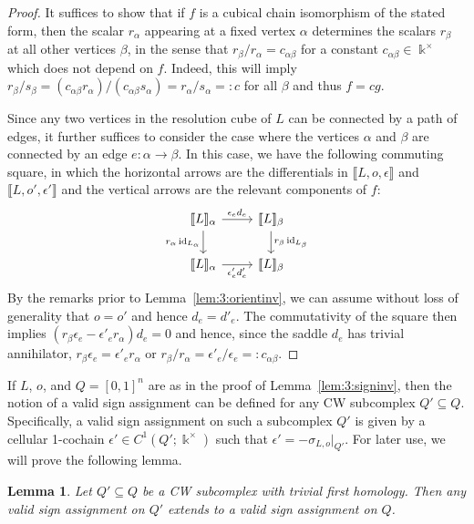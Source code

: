 \documentclass[12pt]{amsart}
\theoremstyle{definition}
\theoremstyle{plain}
\newtheorem{lemma}{Lemma}
\begin{document}
\begin{proof} It suffices to show that if $f$ is a cubical chain isomorphism of the stated form, then
the scalar $r_\alpha$ appearing at a fixed vertex $\alpha$
determines the scalars $r_\beta$ at all other vertices $\beta$, in the sense that $r_\beta/r_\alpha=c_{\alpha\beta}$ for
a constant $c_{\alpha\beta}\in\Bbbk^\times$ which does not depend on $f$. Indeed, this will imply
$r_\beta/s_\beta=(c_{\alpha\beta}r_\alpha)/(c_{\alpha\beta}s_\alpha)=r_\alpha/s_\alpha=:c$ for all $\beta$ and thus $f=cg$.

Since any two vertices in the resolution cube of $L$ can be connected by a path of edges, it further suffices to consider the
case where the vertices $\alpha$ and $\beta$ are connected by an edge $e\colon\alpha\rightarrow\beta$. In this case,
we have the following commuting square, in which the horizontal arrows are the differentials in $\llbracket L,o,\epsilon\rrbracket$ and $\llbracket L,o',\epsilon'\rrbracket$ and the vertical arrows are the relevant components of $f$:
\[
\begin{tikzcd}
\llbracket L\rrbracket_\alpha \ar[r,"\epsilon_ed_e"]\ar[d,"r_\alpha\operatorname{id}_{L_\alpha}"']& \llbracket L\rrbracket_\beta\ar[d,"r_\beta\operatorname{id}_{L_\beta}"]\\
\llbracket L\rrbracket_\alpha \ar[r,"\epsilon'_ed'_e"']& \llbracket L\rrbracket_\beta
\end{tikzcd}
\]
By the remarks prior to Lemma~\ref{lem:3:orientinv}, we can assume without loss of generality that $o=o'$ and hence $d_e=d'_e$. The commutativity of
the square then implies $(r_\beta\epsilon_e-\epsilon'_er_\alpha)d_e=0$ and hence, since the saddle $d_e$ has trivial annihilator,
$r_\beta\epsilon_e=\epsilon'_er_\alpha$ or $r_\beta/r_\alpha=\epsilon'_e/\epsilon_e=:c_{\alpha\beta}$.
\end{proof}

If $L$, $o$, and $Q=[0,1]^n$ are as in the proof of Lemma~\ref{lem:3:signinv}, then the notion of a valid
sign assignment can be defined for any CW subcomplex $Q'\subseteq Q$. Specifically, a valid sign assignment
on such a subcomplex $Q'$ is given by a cellular 1-cochain $\epsilon'\in C^1(Q';\Bbbk^\times)$ such that
$\epsilon'=-\sigma_{L,o}|_{Q'}$. For later use, we will prove the following lemma.

\begin{lemma}\label{lem:3:CWsubcomplex} Let $Q'\subseteq Q$ be a CW subcomplex with trivial first homology.
Then any valid sign assignment on $Q'$ extends to a valid sign assignment on $Q$.
\end{lemma}
\end{document}
